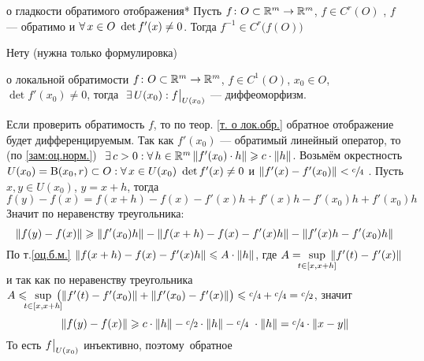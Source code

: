 \begin{teor}[https://www.youtube.com/live/Ebv-BznzM6k?si=DqPdyVd2mmBt4CqQ&t=4595]{о гладкости обратимого отображения}*\label{т. о лок.обр.}
	Пусть $f \colon O \subset \mathbb R^m \to \mathbb R^m$, $f \in  C^r(O)$ , $f$ --- обратимо и $\forall \, x \in O\ \det f'(x) \ne 0$. Тогда $f^{-1} \in C^r\bigl(f(O)\bigr)$  
\end{teor}

\begin{prf}
	Нету (нужна только формулировка)
\end{prf}

\begin{teor}[https://youtu.be/x6Xwr0Rrjz8?si=pXJT-Ozb7d9aW7NH&t=2682]{о локальной обратимости}\label{лок.обр.}
	$f \colon O \subset \mathbb R^m \to \mathbb R^m$, $f \in C^1(O)$, $x_0 \in O$, $\det f'(x_0) \ne 0$, тогда$\E U(x_0) : f\vp{U(x_0)}$ --- диффеоморфизм.
\end{teor}

\begin{prf}
	Если проверить обратимость $f$, то по теор. \ref{т. о лок.обр.} обратное отображение будет дифференцируемым. Так как $f'(x_0)$ --- обратимый линейный оператор, то (по \ref{зам:оц.норм.})$\E c > 0 : \A h \in \rmm$\linebreak $\|f'(x_0) \cdot h\| \geqslant c \cdot \|h\|$. Возьмём окрестность $U(x_0) = \mathrm B(x_0, r) \subset O : \forall \, x \in U(x_0)\ \det f'(x) \ne 0$  и $\|f'(x) - f'(x_0)\| < \sfrac c4$ . Пусть $x, y \in U(x_0)$, $y = x + h$, тогда 
	\[f(y) - f(x) = f(x + h) - f(x) - f'(x)h + f'(x)h - f'(x_0)h + f'(x_0)h\]
	Значит по неравенству треугольника:
	\[\|f(y) - f(x)\| \geqslant \|f'(x_0)h\| - \|f(x + h) - f(x) - f'(x)h\| - \|f'(x)h - f'(x_0)h\|\]
	По т.\hspace{2.1pt}\ref{оц.б.м.} $\|f(x + h) - f(x) - f'(x)h\| \leqslant A \cdot \|h\|$, где $A = \makebox[24pt]{$\sup\limits_{t \in [x, x + h]}$} \|f'(t) - f'(x)\|$ и так как по неравенству треугольника $ A \< \makebox[24pt]{$\sup\limits_{t \in [x, x + h]}$} \bigl(\|f'(t) - f'(x_0)\| + \|f'(x_0) - f'(x)\|\bigr)\< \sfrac c4 + \sfrac c4 = \sfrac c2$, значит
	\[\|f(y) - f(x)\| \geqslant  c \cdot \|h\| - \sfrac c2 \cdot \|h\| - \sfrac c4\ \cdot \|h\| = \sfrac c4 \cdot \|x - y\|\]
	То есть $f\big|_{U(x_0)}^{}$ инъективно, поэтому\E\ обратное
\end{prf}

